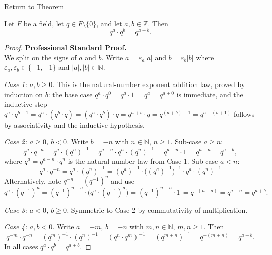 \newpage
{}
\label{prf:integer-exponent-addition-law}

\begin{remark*}[Return]
\hyperref[thm:integer-exponent-addition-law]{Return to Theorem}
\end{remark*}

\begin{theorem*}
Let $F$ be a field, let $q\in F\setminus\{0\}$, and let $a,b\in\mathbb{Z}$.
Then
\[
q^a\cdot q^b = q^{a+b}.
\]
\end{theorem*}

\begin{proof}
\textbf{Professional Standard Proof.}~\\
We split on the signs of $a$ and $b$.  Write $a = \varepsilon_a|a|$ and
$b = \varepsilon_b|b|$ where $\varepsilon_a,\varepsilon_b\in\{+1,-1\}$ and
$|a|,|b|\in\mathbb{N}$.

\emph{Case 1: $a,b\geq 0$.}
This is the natural-number exponent addition law, proved by induction on $b$:
the base case $q^a\cdot q^0 = q^a\cdot 1 = q^a = q^{a+0}$ is immediate, and
the inductive step
$q^a\cdot q^{b+1} = q^a\cdot(q^b\cdot q) = (q^a\cdot q^b)\cdot q
= q^{a+b}\cdot q = q^{(a+b)+1} = q^{a+(b+1)}$ follows by associativity and
the inductive hypothesis.

\emph{Case 2: $a\geq 0$, $b<0$.}
Write $b = -n$ with $n\in\mathbb{N}$, $n\geq 1$.  Sub-case $a\geq n$:
\[
q^a\cdot q^{-n}
= q^a\cdot(q^n)^{-1}
= q^{a-n}\cdot q^n\cdot(q^n)^{-1}
= q^{a-n}\cdot 1
= q^{a-n}
= q^{a+b},
\]
where $q^a = q^{a-n}\cdot q^n$ is the natural-number law from Case 1.
Sub-case $a < n$:
\[
q^a\cdot q^{-n}
= q^a\cdot(q^n)^{-1}
= (q^a)^{-1}\cdot\bigl((q^a)^{-1}\bigr)^{-1}\cdot q^a\cdot(q^n)^{-1}
\]
Alternatively, note $q^{-n} = (q^{-1})^n$ and use
\[
q^a\cdot(q^{-1})^n = (q^{-1})^{n-a}\cdot\bigl(q^a\cdot(q^{-1})^a\bigr)
= (q^{-1})^{n-a}\cdot 1^{\,} = q^{-(n-a)} = q^{a-n} = q^{a+b}.
\]

\emph{Case 3: $a<0$, $b\geq 0$.}  Symmetric to Case 2 by commutativity of
multiplication.

\emph{Case 4: $a,b<0$.}  Write $a = -m$, $b = -n$ with $m,n\in\mathbb{N}$,
$m,n\geq 1$.  Then
\[
q^{-m}\cdot q^{-n}
= (q^m)^{-1}\cdot(q^n)^{-1}
= (q^n\cdot q^m)^{-1}
= (q^{m+n})^{-1}
= q^{-(m+n)}
= q^{a+b}.
\]
In all cases $q^a\cdot q^b = q^{a+b}$.
\end{proof}

